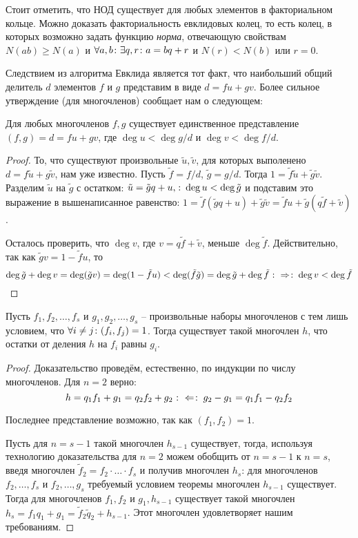 Стоит отметить, что НОД существует для любых элементов в факториальном кольце. Можно доказать факториальность евклидовых колец, то есть колец, в которых возможно задать функцию \emph{норма}, отвечающую свойствам $N(ab)\ge N(a)$ и $\forall a,b\colon\exists q,r\colon a=bq+r$ и $N(r)<N(b)$ или $r=0$.

Следствием из алгоритма Евклида является тот факт, что наибольший общий делитель $d$ элементов $f$ и $g$ представим в виде $d=fu+gv$. Более сильное утверждение (для многочленов) сообщает нам о следующем:

\begin{theorem}
  Для любых многочленов $f,g$ существует единственное представление $(f,g)=d=fu+gv$, где $\deg u<\deg g/d$ и $\deg v<\deg f/d$.
\end{theorem}

\begin{proof}
То, что существуют произвольные $\tilde u,\tilde v$, для которых выполенено $d=f\tilde u+g\tilde v$, нам уже известно. Пусть $\tilde f=f/d$, $\tilde g=g/d$. Тогда $1=\tilde f\tilde u+\tilde g\tilde v$. Разделим $\tilde u$ на $\tilde g$ с остатком: $\tilde u=\tilde gq+u,\colon\deg u<\deg\tilde g$ и подставим это выражение в вышенаписанное равенство: $1=\tilde f(\tilde gq+u)+\tilde g\tilde v=\tilde fu+\tilde g(q\tilde f+\tilde v)$.

Осталось проверить, что $\deg v$, где $v=q\tilde f+\tilde v$, меньше $\deg \tilde f$. Действительно, так как $\tilde gv=1-\tilde fu$, то
$$\deg\tilde g+\deg v=\deg(\tilde gv)=\deg(1-\tilde fu)<\deg (\tilde f\tilde g)=\deg\tilde g+\deg\tilde f\mathbin{\colon\Rightarrow \colon} \deg v<\deg\tilde f$$
\end{proof}

\begin{theorem}[об остатках]
  Пусть $f_1,f_2,\dots,f_s$ и $g_1,g_2,\dots,g_s$ -- произвольные наборы многочленов с тем лишь условием, что $\forall i\ne j\colon (f_i,f_j)=1$. Тогда существует такой многочлен $h$, что остатки от деления $h$ на $f_i$ равны $g_i$.
\end{theorem}
\begin{proof}
  Доказательство проведём, естественно, по индукции по числу многочленов. Для $n=2$ верно: $$h=q_1f_1+g_1=q_2f_2+g_2\mathbin{\colon\Leftarrow \colon} g_2-g_1=q_1f_1-q_2f_2$$
  
  Последнее представление возможно, так как $(f_1,f_2)=1$.
  
  Пусть для $n=s-1$ такой многочлен $h_{s-1}$ существует, тогда, используя технологию доказательства для $n=2$ можем обобщить от $n=s-1$ к $n=s$, введя многочлен $\tilde f_2=f_2\cdot\dots\cdot f_s$ и получив многочлен $h_s$: для многочленов $f_2,\dots, f_s$ и $f_2,\dots , g_s$ требуемый условием теоремы многочлен $h_{s-1}$ существует. Тогда для многочленов $f_1,f_2$ и $g_1, h_{s-1}$ существует такой многочлен $h_s=f_1q_1+g_1=\tilde f_2\tilde q_2+h_{s-1}$. Этот многочлен удовлетворяет нашим требованиям. 
\end{proof}

